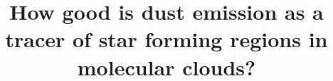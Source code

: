 \documentclass{report}
\title{\vspace{-15mm}\fontsize{24pt}{10pt}\selectfont\textbf{How good is dust emission as a tracer of star forming regions in molecular clouds?}} %
\author{
\large
\textsc{\parbox{\linewidth}{\centering%
Tomas James\endgraf\skip
Student ID: 1158976\endgraf\bigskip}} %
\vspace{-5mm}
}
\date{\large\parbox{\linewidth}{\centering%
  Supervisor: Dr. P. C. Clark \endgraf\bigskip\today}}
\begin{document}
\maketitle %

\thispagestyle{fancy} %


\begin{abstract}

\end{abstract}
\end{document}
